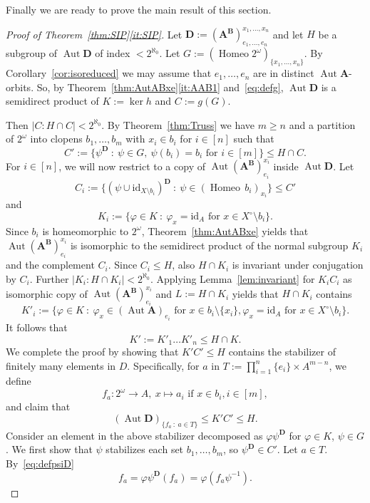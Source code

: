 \documentclass[12pt,a4paper,reqno]{amsart}
\numberwithin{equation}{section}
\theoremstyle{plain}
\theoremstyle{definition}
\newcommand{\A}{\mathbf{A}}
\newcommand{\ABxe}{(\mathbf{A^B})^{x_1,\dots,x_n}_{e_1,\dots,e_n}}
\newcommand{\B}{\mathbf{B}}
\newcommand{\D}{\mathbf{D}}
\newcommand{\id}{\mathrm{id}}
\DeclareMathOperator{\Aut}{Aut}
\DeclareMathOperator{\Homeo}{Homeo}
\newcommand{\st}{\: :\:}
\begin{document}
 Finally we are ready to prove the main result of this section.

\begin{proof}[Proof of Theorem~\ref{thm:SIP}\eqref{it:SIP}]
 Let $\D := \ABxe$ and let $H$ be a subgroup of $\Aut\D$ of index $<2^{\aleph_0}$.
 Let $G:=(\Homeo 2^\omega)_{\{x_1,\dots,x_n\}}$.
 By Corollary~\ref{cor:isoreduced} we may assume that $e_1,\dots,e_n$ are in distinct $\Aut\A$-orbits. 
 So, by Theorem~\ref{thm:AutABxe}\eqref{it:AAB1} and~\eqref{eq:defg}, $\Aut\D$ is a semidirect product of $K := \ker h$ and
 $C := g(G)$.
 
  Then $|C:H\cap C| < 2^{\aleph_0}$. By Theorem~\ref{thm:Truss} we have $m\geq n$ and a partition of $2^\omega$
  into clopens
  $b_1,\dots,b_m$ with $x_i\in b_i$ for $i\in [n]$ such that
  \[ C' := \{ \psi^\D \st \psi\in G,\ \psi(b_i) = b_i \text{ for } i\in [m] \} \leq H\cap C. \]
 For $i\in [n]$, we will now restrict to a copy of $\Aut(\A^\B)^{x_i}_{e_i}$ inside $\Aut\D$. Let
\[ C_i := \{ (\psi \cup \id_{X\setminus b_i})^\D \st \psi \in (\Homeo\, b_i)_{x_i} \} \leq C' \]
 and   
\[ K_i := \{ \varphi\in K \st \varphi_x = \id_A \text{ for } x\in X^\circ \setminus b_i \}. \]
Since $b_i$ is homeomorphic to $2^\omega$, Theorem~\ref{thm:AutABxe} yields that
 $\Aut(\A^\B)^{x_i}_{e_i}$ is isomorphic to the semidirect product of the normal subgroup $K_i$ and the complement $C_i$.
 Since $C_i\leq H$, also $H\cap K_i$ is invariant under conjugation by $C_i$.
 Further $|K_i:H\cap K_i| < 2^{\aleph_0}$.
 Applying Lemma~\ref{lem:invariant} for $K_iC_i$ as isomorphic copy of $\Aut(\A^\B)^{x_i}_{e_i}$ and $L := H\cap K_i$
 yields that $H\cap K_i$ contains
 \[ K'_i := \{\varphi\in K \st \varphi_x \in(\Aut\A)_{e_i} \text{ for } x\in b_i\setminus\{x_i\},   \varphi_x =\id_A \text{ for } x\in X^\circ\setminus b_i \}. \]
 It follows that
\[  K' := K'_1 \dots K'_n \leq H\cap K. \]
 We complete the proof by showing that $K'C' \leq H$ contains the stabilizer of finitely many elements in $D$.
 Specifically,
for $a$ in $T := \prod_{i=1}^n \{e_i\} \times A^{m-n}$, we define
\[ f_a\colon 2^\omega\to A,\ x\mapsto a_i \text{ if } x\in b_i, i\in [m],\]  
and claim that 
\begin{equation} \label{eq:stab}
 (\Aut\D)_{\{f_a \st a\in T\}} \leq K'C' \leq H.
\end{equation}  
 Consider an element in the above stabilizer decomposed as $\varphi\psi^\D$
 for $\varphi\in K$, $\psi\in G$.
 We first show that $\psi$ stabilizes each set $b_1,\dots,b_m$, so $\psi^\D\in C'$.
 Let $a\in T$. By~\eqref{eq:defpsiD}
\[ f_a = \varphi\psi^\D(f_a) = \varphi(f_a\psi^{-1}). \]

\end{proof}
\end{document}
